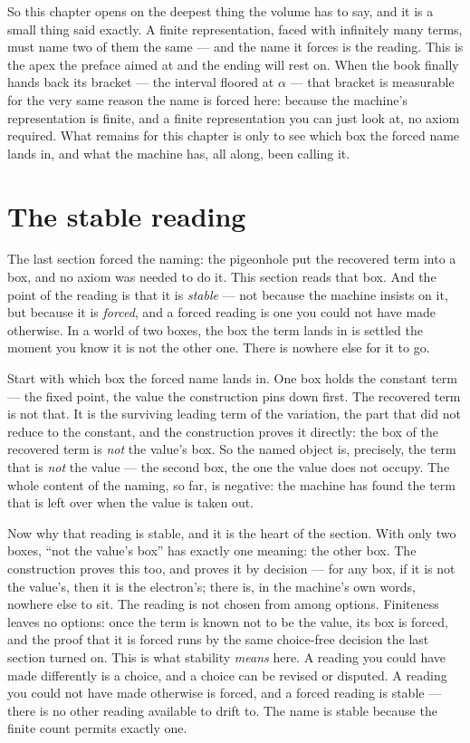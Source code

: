 So this chapter opens on the deepest thing the volume has to say, and it is a small thing said exactly. A finite
representation, faced with infinitely many terms, must name two of them the same --- and the name it forces is the
reading. This is the apex the preface aimed at and the ending will rest on. When the book finally hands back its
bracket --- the interval floored at $\alpha$ --- that bracket is measurable for the very same reason the name is forced
here: because the machine's representation is finite, and a finite representation you can just look at, no axiom
required. What remains for this chapter is only to see which box the forced name lands in, and what the machine has, all
along, been calling it.

\section{The stable reading}

The last section forced the naming: the pigeonhole put the recovered term into a box, and no axiom was needed to do it.
This section reads that box. And the point of the reading is that it is \emph{stable} --- not because the machine
insists on it, but because it is \emph{forced}, and a forced reading is one you could not have made otherwise. In a
world of two boxes, the box the term lands in is settled the moment you know it is not the other one. There is nowhere
else for it to go.

Start with which box the forced name lands in. One box holds the constant term --- the fixed point, the value the
construction pins down first. The recovered term is not that. It is the surviving leading term of the variation, the
part that did not reduce to the constant, and the construction proves it directly: the box of the recovered term is
\emph{not} the value's box. So the named object is, precisely, the term that is \emph{not} the value --- the second
box, the one the value does not occupy. The whole content of the naming, so far, is negative: the machine has found the
term that is left over when the value is taken out.

Now why that reading is stable, and it is the heart of the section. With only two boxes, ``not the value's box'' has
exactly one meaning: the other box. The construction proves this too, and proves it by decision --- for any box, if it
is not the value's, then it is the electron's; there is, in the machine's own words, nowhere else to sit. The reading
is not chosen from among options. Finiteness leaves no options: once the term is known not to be the value, its box is
forced, and the proof that it is forced runs by the same choice-free decision the last section turned on. This is what
stability \emph{means} here. A reading you could have made differently is a choice, and a choice can be revised or
disputed. A reading you could not have made otherwise is forced, and a forced reading is stable --- there is no other
reading available to drift to. The name is stable because the finite count permits exactly one.

